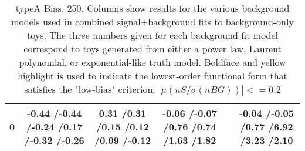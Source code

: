 \documentclass[11pt,final]{article}
\begin{document}
\begin{landscape}
\begin{table}[htb]
\begin{center}
{\begin{tabular}{|c|c|c|c|c|c|}
  \hline 
  0 & -0.44 \slash -0.44 \slash -0.24 \slash 0.17 \slash -0.32 \slash -0.26 & 0.31 \slash 0.31 \slash 0.15 \slash 0.12 \slash 0.09 \slash -0.12 & -0.06 \slash -0.07 \slash 0.76 \slash 0.74 \slash 1.63 \slash 1.82 & \cellcolor{Yellow}{\bf 0.10 \slash 0.11 \slash 0.03 \slash 0.02 \slash 0.00 \slash -0.16} & -0.04 \slash -0.05 \slash 0.77 \slash 6.92 \slash 3.23 \slash 2.10 \\ 
  \hline 
  \end{tabular}%
  }
 \caption{typeA Bias, 250.  Columns show results for the various background models used in combined signal+background fits to background-only toys.  The three numbers given for each background fit model correspond to toys generated from either a power law, Laurent polynomial, or exponential-like truth model.  Boldface and yellow highlight is used to indicate the lowest-order functional form that satisfies the "low-bias" criterion: $|\mu(nS/\sigma(nBG))|<=0.2$  }
 \label{tab:pull}
 \end{center}
\end{table}
\begin{table}[htb]
 \begin{center}
 \caption{typeA Bias, 300.  Columns show results for the various background models used in combined signal+background fits to background-only toys.  The three numbers given for each background fit model correspond to toys generated from either a power law, Laurent polynomial, or exponential-like truth model.  Boldface and yellow highlight is used to indicate the lowest-order functional form that satisfies the "low-bias" criterion: $|\mu(nS/\sigma(nBG))|<=0.2$  }

\end{center}
\end{table}
\end{landscape}
\end{document}
